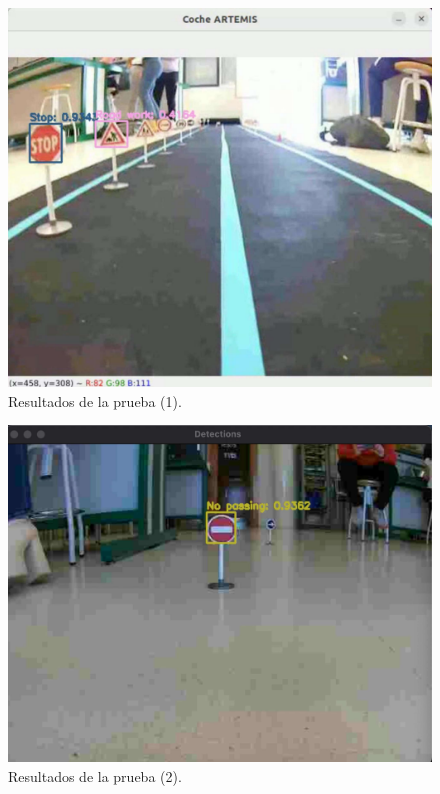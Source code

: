 \begin{figure}[H]
    \centering
 	\includegraphics[width=\textwidth]{Imagenes/IA/YoloCNN_coche.pdf}
    \caption{Resultados de la prueba (1).}
    \label{c1}
\end{figure}


\begin{figure}[H]
    \centering
 	\includegraphics[width=\textwidth]{Imagenes/IA/YoloCNN_coche2.pdf}
    \caption{Resultados de la prueba (2).}
    \label{c2}
\end{figure}


